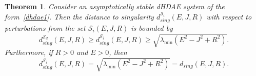 \documentclass[11pt]{article}
\newtheorem{theorem}{Theorem}
\begin{document}
\begin{theorem}\label{thm:dist_singEJR_i}
    Consider an asymptotically stable dHDAE system of the form~\eqref{dhdae1}. Then
the distance to singularity $d_{sing}^{\mathcal S_i}(E,J,R)$ with respect to perturbations from the set $\mathcal S_i(E,J,R)$ is bounded by
    \begin{equation}\label{Si:dist-sing-EJR}
    d_{sing}^{\mathcal S_d}(E,J,R) \geq    d_{sing}^{\mathcal S_i}(E,J,R)\geq \sqrt{\lambda_{\min}(E^2-J^2+R^2)}.
    \end{equation}
    Furthermore, if $R>0$ and $E>0$, then
    \begin{equation}\label{Si:dist-sing-EJR2}
   d_{sing}^{\mathcal S_i}(E,J,R)= \sqrt{\lambda_{\min}(E^2-J^2+R^2)}= d_{sing}(E,J,R).
    \end{equation}
\end{theorem}
\end{document}
